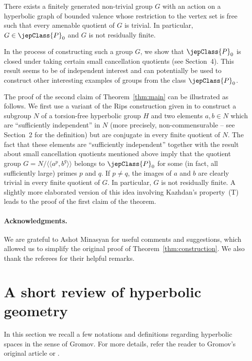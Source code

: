 \begin{theorem}\label{thm:main}
There exists a finitely generated non-trivial group $G$ with an action on a hyperbolic graph of bounded valence whose restriction to the vertex set is free such that every amenable quotient of $G$ is trivial. In particular, $G\in\jepClass{P}_0$ and $G$ is not residually finite.
\end{theorem}

In the process of constructing such a group $G$, we show that $\jepClass{P}_0$ is closed under taking certain small cancellation quotients (see Section~4). This result seems to be of independent interest and can potentially be used to construct other interesting examples of groups from the class $\jepClass{P}_0$.

The proof of the second claim of Theorem~\ref{thm:main} can be illustrated as follows. We first use a variant of the Rips construction given in \cite{ref01} to construct a subgroup $N$ of a torsion-free hyperbolic group $H$ and two elements $a,b\in N$ which are ``sufficiently independent'' in $N$ (more precisely, non-commensurable -- see Section~2 for the definition) but are conjugate in every finite quotient of $N$. The fact that these elements are ``sufficiently independent'' together with the result about small cancellation quotients mentioned above imply that the quotient group $G=N/\langle\!\langle a^p,b^q\rangle\!\rangle$ belongs to $\jepClass{P}_0$ for some (in fact, all sufficiently large) primes $p$ and $q$. If $p\neq q$, the images of $a$ and $b$ are clearly trivial in every finite quotient of $G$. In particular, $G$ is not residually finite.
A slightly more elaborated version of this idea involving Kazhdan's property~(T) leads to the proof of the first claim of the theorem.

\paragraph*{Acknowledgments.}
We are grateful to Ashot Minasyan for useful comments and suggestions, which allowed us to simplify the original proof of Theorem~\ref{thm:construction}. We also thank the referees for their helpful remarks.

\section{A short review of hyperbolic geometry}
In this section we recall a few notations and definitions regarding hyperbolic spaces in the sense of Gromov. For more details, refer the reader to Gromov's original article \cite{ref11} or \cite{ref04,ref10}.

